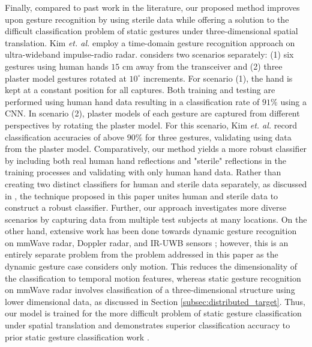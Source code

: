 \documentclass{ieeeaccess}
\begin{document}
Finally, compared to past work in the literature, our proposed method improves upon gesture recognition by using sterile data while offering a solution to the difficult classification problem of static gestures under three-dimensional spatial translation. Kim \textit{et. al.} \cite{static_gesture_recognition:time_domain} employ a time-domain gesture recognition approach on ultra-wideband impulse-radio radar. \cite{static_gesture_recognition:time_domain} considers two scenarios separately: (1) six gestures using human hands $15$ cm away from the transceiver and (2) three plaster model gestures rotated at $10^\circ$ increments. For scenario (1), the hand is kept at a constant position for all captures. Both training and testing are performed using human hand data resulting in a classification rate of $91\%$ using a CNN. In scenario (2), plaster models of each gesture are captured from different perspectives by rotating the plaster model. For this scenario, Kim \textit{et. al.} record classification accuracies of above $90\%$ for three gestures, validating using data from the plaster model. Comparatively, our method yields a more robust classifier by including both real human hand reflections and "sterile" reflections in the training processes and validating with only human hand data. Rather than creating two distinct classifiers for human and sterile data separately, as discussed in \cite{static_gesture_recognition:time_domain}, the technique proposed in this paper unites human and sterile data to construct a robust classifier. Further, our approach investigates more diverse scenarios by capturing data from multiple test subjects at many locations. On the other hand, extensive work has been done towards dynamic gesture recognition on mmWave radar, Doppler radar, and IR-UWB sensors \cite{dynamic_gesture_recognition:application_of_Dopper_DCNN,dynamic_gesture_recognition:low_power,dynamic_gesture_recognition:LSTM,dynamic_gesture_recognition:micro_doppler,dynamic_gesture_recognition:svm,ir-uwb:digit_writing,ir-uwb:dynamic_gesture}; however, this is an entirely separate problem from the problem addressed in this paper as the dynamic gesture case considers only motion. This reduces the dimensionality of the classification to temporal motion features, whereas static gesture recognition on mmWave radar involves classification of a three-dimensional structure using lower dimensional data, as discussed in Section \ref{subsec:distributed_target}. Thus, our model is trained for the more difficult problem of static gesture classification under spatial translation and demonstrates superior classification accuracy to prior static gesture classification work \cite{static_gesture_recognition:time_domain}.
\end{document}
